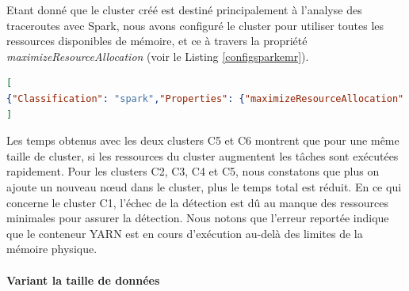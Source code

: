 Etant donné que le cluster créé est destiné principalement à l'analyse des traceroutes avec Spark, nous avons configuré le cluster pour utiliser toutes les ressources disponibles de mémoire, et ce à travers la propriété \textit{maximizeResourceAllocation} (voir le Listing \ref{configsparkemr}). 

\begin{lstlisting}[language=json, basicstyle=\small, label= configsparkemr, caption = Exemple de fichier de configuration d'un cluster Amazon EMR]
[
{"Classification": "spark","Properties": {"maximizeResourceAllocation": "true"} }
]
\end{lstlisting}







Les temps obtenus avec les deux clusters C5 et C6 montrent que pour une même taille de cluster,  si les ressources du cluster augmentent  les tâches sont exécutées rapidement. 
Pour les clusters C2, C3, C4 et C5, nous constatons que plus on ajoute un nouveau n\oe{}ud dans  le cluster, plus le temps total est réduit. En ce qui concerne le cluster C1, l'échec de la détection est dû au manque des ressources minimales pour assurer la détection. Nous notons que l'erreur reportée  indique que le conteneur YARN est en cours d'exécution au-delà des limites de la mémoire physique.


\paragraph{Variant la taille de données}~


